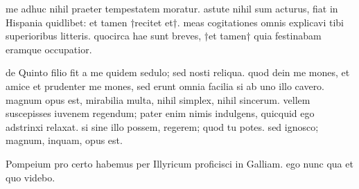 


 me adhuc nihil praeter tempestatem moratur. astute nihil sum acturus, fiat in Hispania quidlibet: et tamen †recitet et†. meas cogitationes omnis explicavi tibi superioribus litteris. quocirca hae sunt breves, †et tamen† quia festinabam eramque occupatior.

 de Quinto filio fit a me quidem sedulo; sed nosti reliqua. quod dein me mones, et amice et prudenter me mones, sed erunt omnia facilia si ab uno illo cavero. magnum opus est, mirabilia multa, nihil simplex, nihil sincerum. vellem suscepisses iuvenem regendum; pater enim nimis indulgens, quicquid ego adstrinxi relaxat. si sine illo possem, regerem; quod tu potes. sed ignosco; magnum, inquam, opus est.

 Pompeium pro certo habemus per Illyricum proficisci in Galliam. ego nunc qua et quo videbo.
